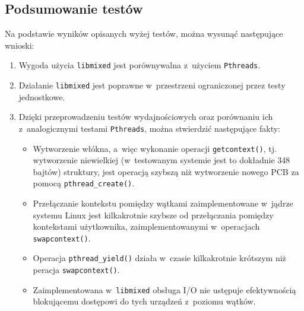 \documentclass[12pt]{mwart}
\newcommand{\code}{\texttt}
\newcommand{\procbr}{()}
\newcommand{\function}[1]{\code{#1\procbr}}
\begin{document}
\subsection{Podsumowanie testów}
\indent
  Na podstawie wyników opisanych wyżej testów, można wysunąć następujące wnioski:
  \begin{enumerate}
    \item Wygoda użycia \code{libmixed} jest porównywalna z~użyciem \code{Pthreads}.
    \item Działanie \code{libmixed} jest poprawne w~przestrzeni ograniczonej przez testy jednostkowe.
    \item Dzięki przeprowadzeniu testów wydajnościowych oraz porównaniu ich z~analogicznymi testami \code{Pthreads}, można stwierdzić
      następujące fakty:
      \begin{itemize}
        \item Wytworzenie włókna, a~więc wykonanie operacji \function{getcontext}, tj. wytworzenie niewielkiej (w~testowanym systemie jest to dokładnie 348 bajtów) struktury, 
          jest operacją szybszą niż wytworzenie nowego PCB za pomocą \function{pthread\_create}.
        \item Przełączanie kontekstu pomiędzy wątkami zaimplementowane \linebreak w~jądrze systemu Linux jest kilkakrotnie szybsze od przełączania pomiędzy kontekstami użytkownika,
          zaimplementowanymi w~operacjach \function{swapcontext}.
        \item Operacja \function{pthread\_yield} działa w~czasie kilkakrotnie krótszym niż \linebreak peracja \function{swapcontext}.
        \item Zaimplementowana w~\code{libmixed} obsługa I/O nie ustępuje efektywnością blokującemu dostępowi do tych urządzeń z~poziomu wątków.
      \end{itemize}
  \end{enumerate}
\par
\newpage
\end{document}

